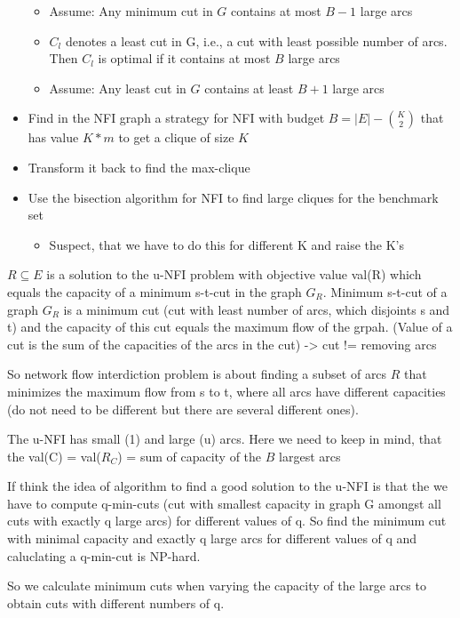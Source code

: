 \documentclass{article}
\begin{document}
\begin{itemize}
\begin{itemize}
        \item Assume: Any minimum cut in $G$ contains at most $B-1$ large arcs
        \item $C_l$ denotes a least cut in G, i.e.,  a cut with least possible number of arcs. Then $C_l$ is optimal if it contains at most $B$ large arcs
        \item Assume: Any least cut in $G$ contains at least $B+1$ large arcs
    \end{itemize}
    \item Find in the NFI graph a strategy for NFI with budget $B = |E| - \binom{K}{2} $ that has value $K*m$ to get a clique of size $K$
    \item Transform it back to find the max-clique
    \item Use the bisection algorithm for NFI to find large cliques for the benchmark set
    \begin{itemize}
        \item Suspect, that we have to do this for different K and raise the K's
    \end{itemize}
\end{itemize}

$R \subseteq E$ is a solution to the u-NFI problem with objective value val(R) which equals the capacity of a minimum s-t-cut in the graph $G_R$.
Minimum s-t-cut of a graph $G_R$ is a minimum cut (cut with least number of arcs, which disjoints s and t) and the capacity of this cut equals the maximum 
flow of the grpah. (Value of a cut is the sum of the capacities of the arcs in the cut) -> cut != removing arcs

So network flow interdiction problem is about finding a subset of arcs $R$ that minimizes the maximum flow from s to t, where all arcs have different capacities 
(do not need to be different but there are several different ones).

The u-NFI has small (1) and large (u) arcs. Here we need to keep in mind, that the val(C) = val($R_C$) = sum of capacity of the $B$ largest arcs


If think the idea of algorithm to find a good solution to the u-NFI is that the we have to compute q-min-cuts 
(cut with smallest capacity in graph G amongst all cuts with exactly q large arcs) for different values of q. So find the minimum cut with minimal capacity
and exactly q large arcs for different values of q and caluclating a q-min-cut is NP-hard.

So we calculate minimum cuts when varying the capacity of the large arcs to obtain cuts with different numbers of q.
\end{document}
